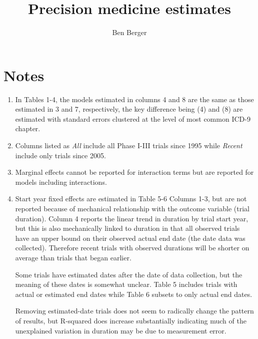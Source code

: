 \documentclass{article}
\title{Precision medicine estimates}
\author{Ben Berger}
\begin{document}
\maketitle

\section*{Notes}
\begin{enumerate}

\item In Tables 1-4, the models estimated in columns 4 and 8 are the same as those estimated in 3 and 7, respectively, the key difference being (4) and (8) are estimated with standard errors clustered at the level of most common ICD-9 chapter. 

\item Columns listed as \textit{All} include all Phase I-III trials since 1995 while \textit{Recent} include only trials since 2005.

\item Marginal effects cannot be reported for interaction terms but are reported for models including interactions.

\item Start year fixed effects are estimated in Table 5-6 Columns 1-3, but are not reported because of mechanical relationship with the outcome variable (trial duration). Column 4 reports the linear trend in duration by trial start year, but this is also mechanically linked to duration in that all observed trials have an upper bound on their observed actual end date (the date data was collected). Therefore recent trials with observed durations will be shorter on average than trials that began earlier.

Some trials have estimated dates after the date of data collection, but the meaning of these dates is somewhat unclear. Table 5 includes trials with actual or estimated end dates while Table 6 subsets to only actual end dates.

Removing estimated-date trials does not seem to radically change the pattern of results, but R-squared does increase substantially indicating much of the unexplained variation in duration may be due to measurement error.

\end{enumerate}

\pagebreak

\begin{landscape}









\end{landscape}






\end{document}
